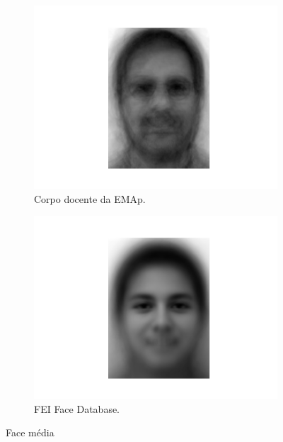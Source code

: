 \documentclass[12pt]{article}
\begin{document}
        \begin{figure}[H]
              \begin{subfigure}{0.35\textwidth}
                \centering
                \includegraphics[width=\textwidth]{img/EMAP_0.png}
                \caption{Corpo docente da EMAp.}
                \label{fig:imagem1}
              \end{subfigure}
              \hfill
              \begin{subfigure}{0.35\textwidth}
                \centering
                \includegraphics[width=\textwidth]{img/MAIN_0.png}
                \caption{FEI Face Database.}
                \label{fig:imagem2}
              \end{subfigure}
              \caption{Face média}
            \end{figure}
            
\end{document}
